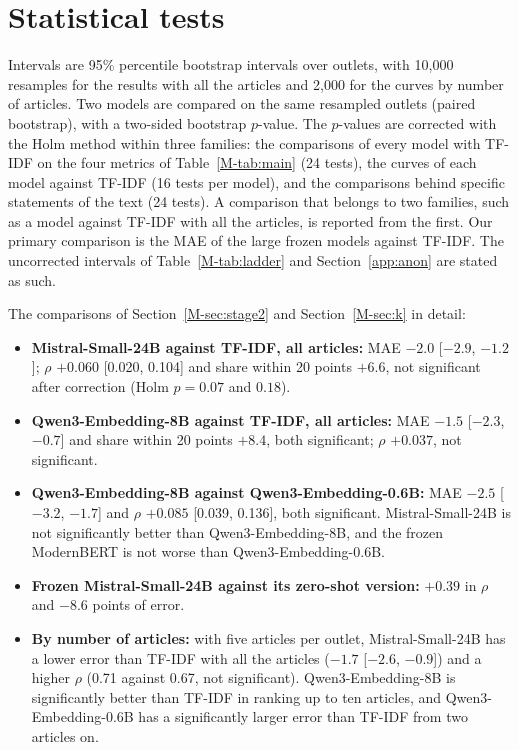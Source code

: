 \documentclass[11pt,a4paper]{article}
\begin{document}
\section{Statistical tests}\label{app:stats}
Intervals are 95\% percentile bootstrap intervals over outlets, with 10,000 resamples for the results with all the
articles and 2,000 for the curves by number of articles. Two models are compared on the same resampled outlets (paired
bootstrap), with a two-sided bootstrap $p$-value. The $p$-values are corrected with the Holm method within three
families: the comparisons of every model with TF-IDF on the four metrics of Table~\ref{M-tab:main} (24 tests), the
curves of each model against TF-IDF (16 tests per model), and the comparisons behind specific statements of the text
(24 tests). A comparison that belongs to two families, such as a model against TF-IDF with all the articles, is
reported from the first. Our primary comparison is the MAE of the large frozen models against TF-IDF. The uncorrected
intervals of Table~\ref{M-tab:ladder} and Section~\ref{app:anon} are stated as such.

The comparisons of Section~\ref{M-sec:stage2} and Section~\ref{M-sec:k} in detail:
\begin{itemize}
  \item \textbf{Mistral-Small-24B against TF-IDF, all articles:} MAE $-2.0$ [$-2.9$, $-1.2$]; $\rho$ $+0.060$ [0.020,
        0.104] and share within 20 points $+6.6$, not significant after correction (Holm $p = 0.07$ and $0.18$).
  \item \textbf{Qwen3-Embedding-8B against TF-IDF, all articles:} MAE $-1.5$ [$-2.3$, $-0.7$] and share within 20 points
        $+8.4$, both significant; $\rho$ $+0.037$, not significant.
  \item \textbf{Qwen3-Embedding-8B against Qwen3-Embedding-0.6B:} MAE $-2.5$ [$-3.2$, $-1.7$] and $\rho$ $+0.085$ [0.039,
        0.136], both significant. Mistral-Small-24B is not significantly better than Qwen3-Embedding-8B, and the frozen
        ModernBERT is not worse than Qwen3-Embedding-0.6B.
  \item \textbf{Frozen Mistral-Small-24B against its zero-shot version:} $+0.39$ in $\rho$ and $-8.6$ points of error.
  \item \textbf{By number of articles:} with five articles per outlet, Mistral-Small-24B has a lower error than TF-IDF
        with all the articles ($-1.7$ [$-2.6$, $-0.9$]) and a higher $\rho$ (0.71 against 0.67, not significant).
        Qwen3-Embedding-8B is significantly better than TF-IDF in ranking up to ten articles, and Qwen3-Embedding-0.6B has
        a significantly larger error than TF-IDF from two articles on.
\end{itemize}
\end{document}

